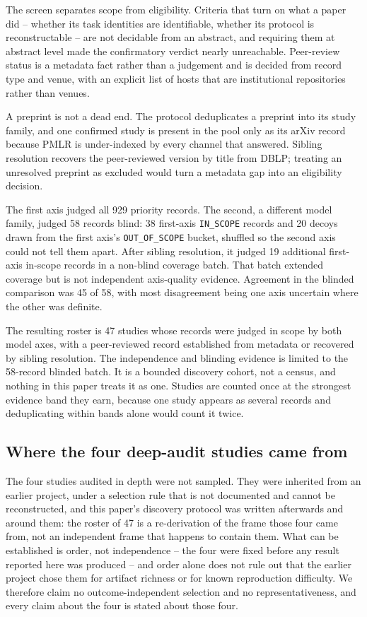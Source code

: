 The screen separates scope from eligibility. Criteria
that turn on what a paper did -- whether its task identities are identifiable, whether its
protocol is reconstructable -- are not decidable from an abstract, and requiring them at
abstract level made the confirmatory verdict nearly unreachable. Peer-review status is a
metadata fact rather than a judgement and is decided from record type and venue, with an
explicit list of hosts that are institutional repositories rather than venues.

A preprint is not a dead end. The protocol deduplicates a preprint into its study family,
and one confirmed study is present in the pool only as its arXiv record because PMLR is
under-indexed by every channel that answered. Sibling resolution recovers the peer-reviewed
version by title from DBLP; treating an unresolved preprint as excluded would turn a
metadata gap into an eligibility decision.

The first axis judged all 929 priority records. The second, a different model family, judged
58 records blind: 38 first-axis \texttt{IN\_SCOPE} records and 20 decoys drawn from the first
axis's \texttt{OUT\_OF\_SCOPE} bucket, shuffled so the second axis could not tell them apart. After sibling
resolution, it judged 19 additional first-axis in-scope records in a non-blind coverage
batch. That batch extended coverage but is not independent axis-quality evidence. Agreement
in the blinded comparison was 45 of 58, with most disagreement being one axis uncertain
where the other was definite.

The resulting roster is 47 studies whose records were judged in scope by both model axes,
with a peer-reviewed record established from metadata or recovered by sibling resolution.
The independence and blinding evidence is limited to the 58-record blinded batch. It is a bounded
discovery cohort, not a census, and nothing in this paper treats it as one. Studies are
counted once at the strongest evidence band they earn, because one study appears as several
records and deduplicating within bands alone would count it twice.

\subsection{Where the four deep-audit studies came from}
\label{sec:method:provenance}

The four studies audited in depth were not sampled. They were inherited from an earlier
project, under a selection rule that is not documented and cannot be reconstructed, and this
paper's discovery protocol was written afterwards and around them: the roster of 47 is a
re-derivation of the frame those four came from, not an independent frame that happens to
contain them. What can be established is order, not independence -- the four were fixed
before any result reported here was produced -- and order alone does not rule out that the
earlier project chose them for artifact richness or for known reproduction difficulty. We
therefore claim no outcome-independent selection and no representativeness, and every claim
about the four is stated about those four.

